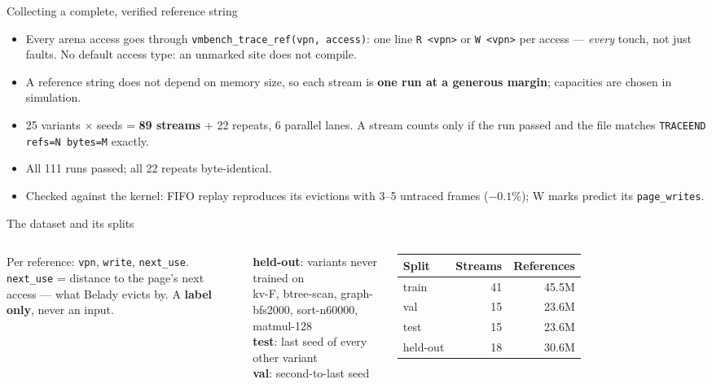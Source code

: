 \documentclass[10pt,aspectratio=169]{beamer}
\newcommand{\good}[1]{\textcolor{good}{#1}}
\begin{document}
\begin{frame}{Collecting a complete, verified reference string}
  \small
  \begin{itemize}
    \item Every arena access goes through \texttt{vmbench\_trace\_ref(vpn, access)}:
      one line \texttt{R <vpn>} or \texttt{W <vpn>} per access --- \emph{every}
      touch, not just faults. No default access type: an unmarked site does not compile.
    \item A reference string does not depend on memory size, so each stream is
      \textbf{one run at a generous margin}; capacities are chosen in simulation.
    \item 25 variants $\times$ seeds = \textbf{89 streams} + 22 repeats, 6 parallel lanes.
      A stream counts only if the run passed and the file matches
      \texttt{TRACEEND refs=N bytes=M} exactly.
    \item All 111 runs passed; all 22 repeats \good{byte-identical}.
    \item Checked against the kernel: FIFO replay reproduces its evictions with
      3--5 untraced frames ($-0.1\%$); W marks predict its \texttt{page\_writes}.
  \end{itemize}
\end{frame}

\begin{frame}{The dataset and its splits}
  \small
  \begin{columns}[T]
    Per reference: \texttt{vpn}, \texttt{write}, \texttt{next\_use}.\\
    \texttt{next\_use} = distance to the page's next access --- what Belady evicts by.
    A \textbf{label only}, never an input.

    \medskip
    \textbf{held-out}: variants never trained on\\
    \quad kv-F, btree-scan, graph-bfs2000, sort-n60000, matmul-128\\
    \textbf{test}: last seed of every other variant\\
    \textbf{val}: second-to-last seed
    \centering
    \begin{tabular}{lrr}
      \toprule
      Split & Streams & References \\
      \midrule
      train & 41 & 45.5M \\
      val & 15 & 23.6M \\
      test & 15 & 23.6M \\
      held-out & 18 & 30.6M \\
      \bottomrule
    \end{tabular}
  \end{columns}
\end{frame}
\end{document}
